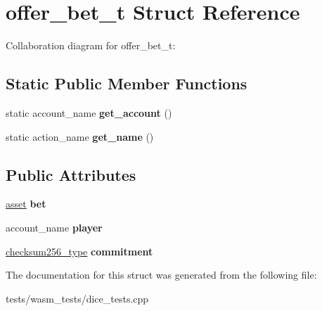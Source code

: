 \hypertarget{structoffer__bet__t}{}\section{offer\+\_\+bet\+\_\+t Struct Reference}
\label{structoffer__bet__t}


Collaboration diagram for offer\+\_\+bet\+\_\+t\+:
\subsection*{Static Public Member Functions}
\begin{DoxyCompactItemize}
\item 
\mbox{\label{structoffer__bet__t_a18a224289daf6cce487526277db7be9b}} 
static account\+\_\+name {\bfseries get\+\_\+account} ()
\item 
\mbox{\label{structoffer__bet__t_a8537f53d3d7eeefcb974dfa80b5300eb}} 
static action\+\_\+name {\bfseries get\+\_\+name} ()
\end{DoxyCompactItemize}
\subsection*{Public Attributes}
\begin{DoxyCompactItemize}
\item 
\mbox{\label{structoffer__bet__t_a802a5f9b3b9a058dfa81cfe51a4746c8}} 
\mbox{\hyperlink{structaacio_1_1asset}{asset}} {\bfseries bet}
\item 
\mbox{\label{structoffer__bet__t_ac7685b3eda37ee4599d1516ac686780f}} 
account\+\_\+name {\bfseries player}
\item 
\mbox{\label{structoffer__bet__t_abfc75ffe7d7be9cb9f72ea73d5c35463}} 
\mbox{\hyperlink{classfc_1_1sha256}{checksum256\+\_\+type}} {\bfseries commitment}
\end{DoxyCompactItemize}


The documentation for this struct was generated from the following file\+:\begin{DoxyCompactItemize}
\item 
tests/wasm\+\_\+tests/dice\+\_\+tests.\+cpp\end{DoxyCompactItemize}

